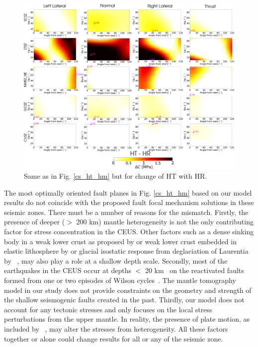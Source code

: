 \documentclass[draft,linenumbers]{agujournal2018}
\begin{document}
%
\begin{figure}[ht]
    \centering
    \includegraphics[width=\linewidth]{figures/ht_hr_summ.png}
    \caption{Same as in Fig. \ref{cs_ht_hm} but for change of HT with HR.}
    \label{cs_ht_hr}
\end{figure}

     The most optimally oriented fault planes in Fig. \ref{cs_ht_hm} based on our model results do not coincide with the proposed fault focal mechanism solutions in these seismic zones. There must be a number of reasons for the mismatch. Firstly, the presence of deeper ($>$ 200 km) mantle heterogeneity is not the only contributing factor for stress concentration in the CEUS. Other factors such as a dense sinking body in a weak lower crust as proposed by \citet{Pollitz_2001} or weak lower crust embedded in elastic lithosphere by \citet{Kenner_2000a} or glacial isostatic response from deglaciation of Laurentia by ~\citet{Grollimund_2001}, may also play a role at a shallow depth scale.  Secondly, most of the earthquakes in the CEUS occur at depths $<$ 20 km~\citep[e.g.,][]{bollinger1985seismicity, chiu1992imaging, powell2016grenville} on the reactivated faults formed from one or two episodes of Wilson cycles~\citep{thomas2006tectonic, wolin2012mineral}. The mantle tomography model in our study does not provide constraints on the geometry and strength of the shallow seismogenic faults created in the past. Thirdly, our model does not account for any tectonic stresses and only focuses on the local stress perturbations from the upper mantle. In reality, the presence of plate motion, as included by~\citet{zhan2016stress} \citet{levandowski2016dense}, may alter the stresses from heterogeneity. All these factors together or alone could change results for all or any of the seismic zone.
    
\end{document}
